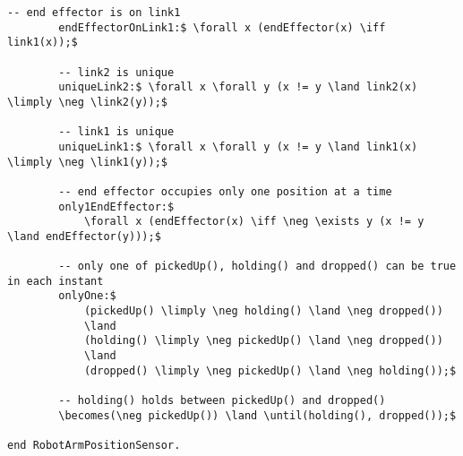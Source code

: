 \begin{lstlisting}[fontadjust, mathescape, frame=single]
        -- end effector is on link1
        endEffectorOnLink1:$ \forall x (endEffector(x) \iff link1(x));$

        -- link2 is unique
        uniqueLink2:$ \forall x \forall y (x != y \land link2(x) \limply \neg \link2(y));$

        -- link1 is unique
        uniqueLink1:$ \forall x \forall y (x != y \land link1(x) \limply \neg \link1(y));$

        -- end effector occupies only one position at a time
        only1EndEffector:$
            \forall x (endEffector(x) \iff \neg \exists y (x != y \land endEffector(y)));$

        -- only one of pickedUp(), holding() and dropped() can be true in each instant
        onlyOne:$
            (pickedUp() \limply \neg holding() \land \neg dropped())
            \land
            (holding() \limply \neg pickedUp() \land \neg dropped())
            \land
            (dropped() \limply \neg pickedUp() \land \neg holding());$

        -- holding() holds between pickedUp() and dropped()
        \becomes(\neg pickedUp()) \land \until(holding(), dropped());$

end RobotArmPositionSensor.\end{lstlisting}